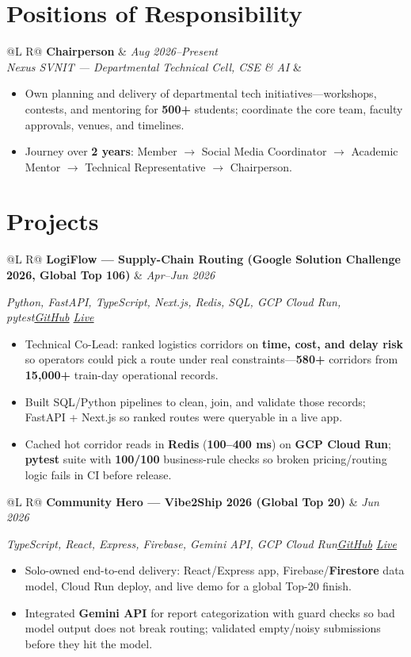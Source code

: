 \documentclass[a4paper,10pt]{article}
\makeatletter
\newcommand{\job}[4]{%
  \vspace{1.4mm}
  \noindent\begin{tabularx}{\textwidth}{@{}L R@{}}
    \textbf{#1} & \textit{\small #2} \\
    \textit{\small #3} & \\
  \end{tabularx}\par
  \vspace{0.7mm}%
}
\newcommand{\proj}[4]{%
  \vspace{1.6mm}
  \noindent\begin{tabularx}{\textwidth}{@{}L R@{}}
    \textbf{#1} & \textit{\small #2} \\
  \end{tabularx}\par
  {\small\textit{#3}\hfill\textit{#4}}\par
  \vspace{0.5mm}%
}
\makeatother
\begin{document}
\section{Positions of Responsibility}
\job{Chairperson}{Aug 2026--Present}{Nexus SVNIT --- Departmental Technical Cell, CSE \& AI}{}
\begin{itemize}
  \item Own planning and delivery of departmental tech initiatives---workshops, contests, and mentoring for \textbf{500+} students; coordinate the core team, faculty approvals, venues, and timelines.
  \item Journey over \textbf{2 years}: Member $\to$ Social Media Coordinator $\to$ Academic Mentor $\to$ Technical Representative $\to$ Chairperson.
\end{itemize}
\section{Projects}
\proj{LogiFlow --- Supply-Chain Routing (Google Solution Challenge 2026, Global Top 106)}{Apr--Jun 2026}
{Python, FastAPI, TypeScript, Next.js, Redis, SQL, GCP Cloud Run, pytest}
{\href{https://github.com/Ojas-Srivastava05/LogiFlow-Solution-Challenge-2026}{GitHub} \textbar{} \href{https://logi-flow-solution-challenge-2026.vercel.app}{Live}}
\begin{itemize}
  \item Technical Co-Lead: ranked logistics corridors on \textbf{time, cost, and delay risk} so operators could pick a route under real constraints---\textbf{580+} corridors from \textbf{15,000+} train-day operational records.
  \item Built SQL/Python pipelines to clean, join, and validate those records; FastAPI + Next.js so ranked routes were queryable in a live app.
  \item Cached hot corridor reads in \textbf{Redis} (\textbf{100--400 ms}) on \textbf{GCP Cloud Run}; \textbf{pytest} suite with \textbf{100/100} business-rule checks so broken pricing/routing logic fails in CI before release.
\end{itemize}

\proj{Community Hero --- Vibe2Ship 2026 (Global Top 20)}{Jun 2026}
{TypeScript, React, Express, Firebase, Gemini API, GCP Cloud Run}
{\href{https://github.com/Ojas-Srivastava05/community-hero}{GitHub} \textbar{} \href{https://community-hero-987477089222.asia-south1.run.app}{Live}}
\begin{itemize}
  \item Solo-owned end-to-end delivery: React/Express app, Firebase/\textbf{Firestore} data model, Cloud Run deploy, and live demo for a global Top-20 finish.
  \item Integrated \textbf{Gemini API} for report categorization with guard checks so bad model output does not break routing; validated empty/noisy submissions before they hit the model.
\end{itemize}
\end{document}
